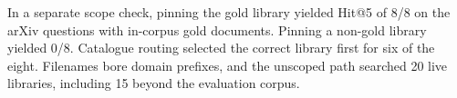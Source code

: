 In a separate scope check, pinning the gold library yielded Hit@5 of
8/8 on the arXiv questions with in-corpus gold documents. Pinning a
non-gold library yielded 0/8. Catalogue routing selected the correct
library first for six of the eight. Filenames bore domain prefixes,
and the unscoped path searched 20 live libraries, including 15 beyond
the evaluation corpus.
